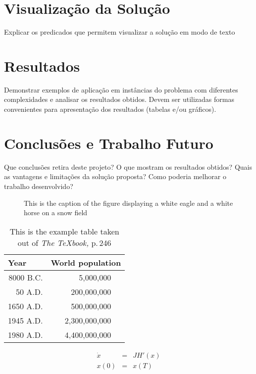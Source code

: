 \documentclass{llncs}
\begin{document}
\section{Visualização da Solução}
Explicar os predicados que permitem visualizar a solução em modo de texto

\section{Resultados}
Demonstrar exemplos de aplicação em instâncias do problema com
diferentes complexidades e analisar os resultados obtidos. Devem ser utilizadas formas
convenientes para apresentação dos resultados (tabelas e/ou gráficos).

\section{Conclusões e Trabalho Futuro}
 Que conclusões retira deste projeto? O que mostram os resultados obtidos? Quais as vantagens e limitações da
solução proposta? Como poderia melhorar o trabalho desenvolvido?

\begin{figure}
\vspace{2.5cm}
\caption{This is the caption of the figure displaying a white eagle and
a white horse on a snow field}
\end{figure}

\begin{table}
\caption{This is the example table taken out of {\it The
\TeX{}book,} p.\,246}
\begin{center}
\begin{tabular}{r@{\quad}rl}
\hline
\multicolumn{1}{l}{\rule{0pt}{12pt}
                   Year}&\multicolumn{2}{l}{World population}\\[2pt]
\hline\rule{0pt}{12pt}
8000 B.C.  &     5,000,000& \\
  50 A.D.  &   200,000,000& \\
1650 A.D.  &   500,000,000& \\
1945 A.D.  & 2,300,000,000& \\
1980 A.D.  & 4,400,000,000& \\[2pt]
\hline
\end{tabular}
\end{center}
\end{table}

\begin{equation}
\begin{array}{rcl}
  \dot{x}&=&JH' (x)\\
  x(0)&=&x (T)
\end{array}
\end{equation}
\end{document}
